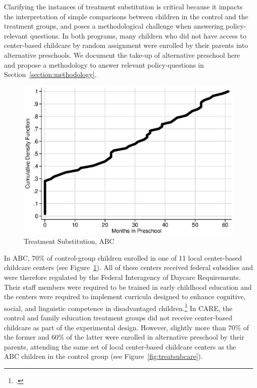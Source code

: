 \noindent Clarifying the instances of treatment substitution is critical because it impacts the interpretation of simple comparisons between children in the control and the treatment groups, and poses a methodological challenge when answering policy-relevant questions.
In both programs, many children who did not have access to center-based childcare by random assignment were enrolled by their parents into alternative preschools. We document the take-up of alternative preschool here and propose a methodology to answer relevant policy-questions in Section~\ref{section:methodology}.\\

\begin{figure}[H]
		\caption{Treatment Substitution, ABC} \label{fig:treatsubabc}
		\includegraphics[width=.9\columnwidth]{output/abc_controlcontamination_months.eps}
\end{figure}

\noindent In ABC, $70\%$ of control-group children enrolled in one of 11 local center-based childcare centers (see Figure~\ref{fig:treatsubabc}). All of these centers received federal subsidies and were therefore regulated by the Federal Interagency of Daycare Requirements. Their staff members were required to be trained in early childhood education and the centers were required to implement curricula designed to enhance cognitive, social, and linguistic competence in disadvantaged children.\footnote{\citet{Burchinal_etal_1989_CD_Daycare-Pre-K-Dev}.} In CARE, the control and family education treatment groups did not receive center-based childcare as part of the experimental design. However, slightly more than $70\%$ of the  former and $60\%$ of the latter were enrolled in alternative preschool by their parents, attending the same set of local center-based childcare centers as the ABC children in the control group (see Figure~\ref{fig:treatsubcare}).\\

